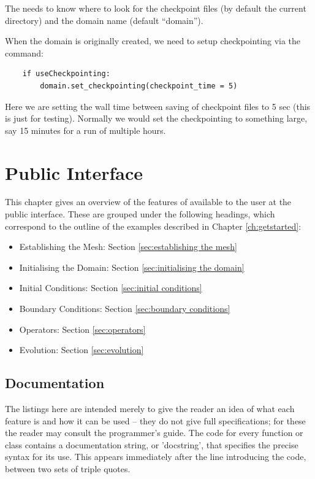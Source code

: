 \documentclass{manual}
\begin{document}
The  needs to know where to look for the checkpoint files (by default the current directory) and the domain name (default ``domain'').

When the domain is originally created, we need to setup checkpointing via the command:
\begin{verbatim}
    if useCheckpointing:
        domain.set_checkpointing(checkpoint_time = 5)
\end{verbatim}

Here we are setting the wall time between saving of checkpoint files to 5 sec (this is just for testing). Normally we would set the checkpointing to something large, say 15 minutes for a run of multiple hours. 





\chapter{\anuga Public Interface}
\label{ch:interface}

This chapter gives an overview of the features of \anuga available
to the user at the public interface. These are grouped under the
following headings, which correspond to the outline of the examples
described in Chapter \ref{ch:getstarted}:
\begin{itemize}
    \item Establishing the Mesh: Section \ref{sec:establishing the mesh}
    \item Initialising the Domain: Section \ref{sec:initialising the domain}
    \item Initial Conditions: Section \ref{sec:initial conditions}
    \item Boundary Conditions: Section \ref{sec:boundary conditions}
    \item Operators: Section \ref{sec:operators}
    \item Evolution: Section \ref{sec:evolution}
\end{itemize}

\section{Documentation}

The listings here are intended merely to give the reader an idea of what
each feature is and how it can be used -- they do
not give full specifications; for these the reader
may consult the programmer's guide. The code for every function or class contains
a documentation string, or 'docstring', that specifies the precise
syntax for its use. This appears immediately after the line
introducing the code, between two sets of triple quotes.
\end{document}
